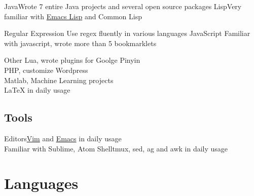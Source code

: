 \documentclass[11pt,a4paper,nolmodern]{moderncv}
\begin{document}
\cvcomputer
{Java}{Wrote 7 entire Java projects and several open source packages}
{Lisp}{Very familiar with \href{http://osrc.dfm.io/xcv58}{Emacs Lisp} and Common Lisp}

\cvcomputer
{Regular Expression}{
  Use regex fluently in various languages
}
{JavaScript}{
  Familiar with javascript, wrote more than 5 bookmarklets\\
}

\cvcomputer
{Other}{
  Lua, wrote plugins for Goolge Pinyin\\
  PHP, customize Wordpress\\
  Matlab, Machine Learning projects\\
  {\LaTeX} in daily usage
}
{}{}

\subsection{Tools}
\cvcomputer
{Editors}{\href{https://github.com/xcv58/Vim_config}{Vim} and \href{https://github.com/xcv58/Emacs_config}{Emacs} in daily usage\\
Familiar with Sublime, Atom}
{Shell}{tmux, sed, ag and awk in daily usage}

\section{Languages}





%

\end{document}
